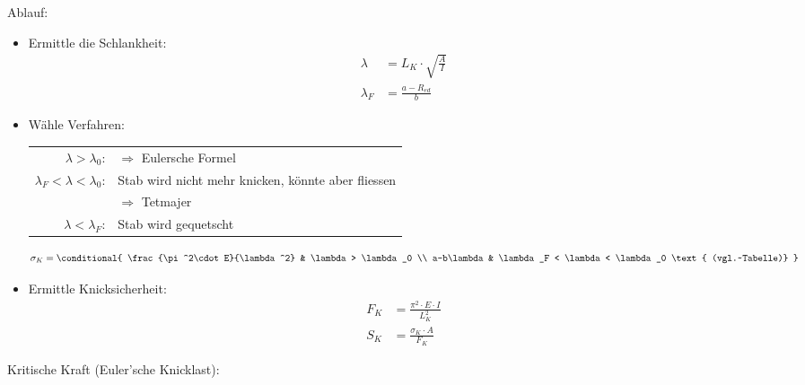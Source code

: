 	Ablauf:
	\begin{itemize}
		\item Ermittle die Schlankheit:
			\begin{align*}
				\lambda &= L_K \cdot \sqrt{\frac{A}{I}} \\
				\lambda_F &= \frac{a - R_{ed}}{b}
			\end{align*}
		\item Wähle Verfahren: \\
			\begin{tabular}{rp{5cm}}
				$\lambda > \lambda_0$: & $\Rightarrow$ Eulersche Formel \\
				$\lambda_F < \lambda < \lambda_0$: & Stab wird nicht mehr knicken, könnte aber fliessen \\[-.5ex] &
				$\Rightarrow$ Tetmajer \\
				$\lambda < \lambda_F$: & Stab wird gequetscht
			\end{tabular}
			
			\begin{equation*}
				\sigma_K = \conditional{
					\frac{\pi^2\cdot E}{\lambda^2} & \lambda > \lambda_0 \\
					a-b\lambda & \lambda_F < \lambda < \lambda_0 \text{ (vgl.~Tabelle)}
				}
			\end{equation*}
		\item Ermittle Knicksicherheit:
			\begin{align*}
				F_K &= \frac{\pi^2\cdot E \cdot I}{L_K^2} \\
				S_K &= \frac{\sigma_K \cdot A}{F_K}
			\end{align*}
	\end{itemize}

	Kritische Kraft (Euler'sche Knicklast):
	
